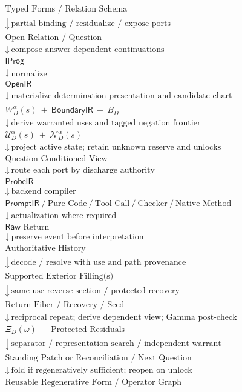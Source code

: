 \documentclass[11pt,oneside]{article}
\newcommand{\Raw}{\mathsf{Raw}}
\newcommand{\OpenIR}{\mathsf{OpenIR}}
\newcommand{\ProbeIR}{\mathsf{ProbeIR}}
\newcommand{\BoundaryIR}{\mathsf{BoundaryIR}}
\newcommand{\PromptIR}{\mathsf{PromptIR}}
\begin{document}
\[
\boxed{
\begin{array}{c}
\text{Typed Forms / Relation Schema}\\
\downarrow\ \text{partial binding / residualize / expose ports}\\
\text{Open Relation / Question}\\
\downarrow\ \text{compose answer-dependent continuations}\\
\mathsf{IProg}\\
\downarrow\ \text{normalize}\\
\OpenIR\\
\downarrow\ \text{materialize determination presentation and candidate chart}\\
W_D^\alpha(s)\ +\ \BoundaryIR\ +\ \widetilde B_D\\
\downarrow\ \text{derive warranted uses and tagged negation frontier}\\
\mathcal U_D^\alpha(s)\ +\ \mathcal N_D^\alpha(s)\\
\downarrow\ \text{project active state; retain unknown reserve and unlocks}\\
\text{Question-Conditioned View}\\
\downarrow\ \text{route each port by discharge authority}\\
\ProbeIR\\
\downarrow\ \text{backend compiler}\\
\PromptIR\ /\ \text{Pure Code}\ /\ \text{Tool Call}\ /\ \text{Checker}\ /\ \text{Native Method}\\
\downarrow\ \text{actualization where required}\\
\Raw\text{ Return}\\
\downarrow\ \text{preserve event before interpretation}\\
\text{Authoritative History}\\
\downarrow\ \text{decode / resolve with use and path provenance}\\
\text{Supported Exterior Filling(s)}\\
\downarrow\ \text{same-use reverse section / protected recovery}\\
\text{Return Fiber / Recovery / Seed}\\
\downarrow\ \text{reciprocal repeat; derive dependent view; Gamma post-check}\\
\Xi_D(\omega)\ +\ \text{Protected Residuals}\\
\downarrow\ \text{separator / representation search / independent warrant}\\
\text{Standing Patch or Reconciliation / Next Question}\\
\downarrow\ \text{fold if regeneratively sufficient; reopen on unlock}\\
\text{Reusable Regenerative Form / Operator Graph}
\end{array}
}
\]
\end{document}
